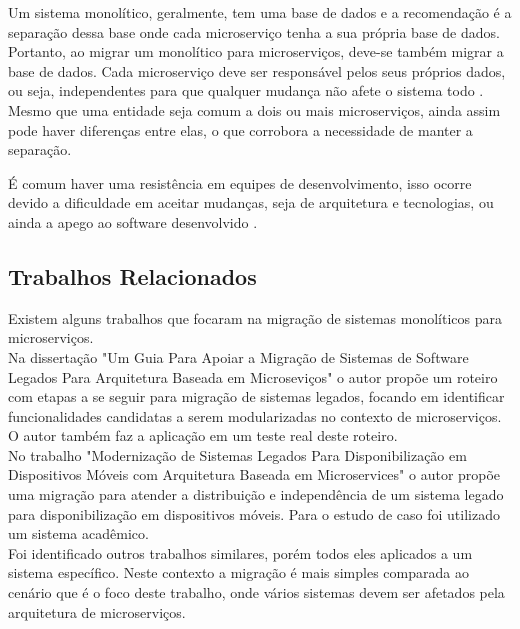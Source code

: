 \documentclass[12pt]{article}
\begin{document}

Um sistema monolítico, geralmente, tem uma base de dados e a recomendação é a separação dessa base onde cada microserviço tenha a sua própria base de dados. Portanto, ao migrar um monolítico para microserviços, deve-se também migrar a base de dados. Cada microserviço deve ser responsável pelos seus próprios dados, ou seja, independentes para que qualquer mudança não afete o sistema todo \cite{Kholy2019}. Mesmo que uma entidade seja comum a dois ou mais microserviços, ainda assim pode haver diferenças entre elas, o que corrobora a necessidade de manter a separação.

É comum haver uma resistência em equipes de desenvolvimento, isso ocorre devido a dificuldade em aceitar mudanças, seja de arquitetura e tecnologias, ou ainda a apego ao software desenvolvido \cite{Taibi}.


\subsection{Trabalhos Relacionados}
Existem alguns trabalhos que focaram na migração de sistemas monolíticos para microserviços.
\\Na dissertação "Um Guia Para Apoiar a Migração de Sistemas de Software Legados Para Arquitetura Baseada em Microseviços"\hspace{0.05cm} o autor propõe um roteiro com etapas a se seguir para migração de sistemas legados, focando em identificar funcionalidades candidatas a serem modularizadas no contexto de microserviços. O autor também faz a aplicação em um teste real deste roteiro.
\\No trabalho "Modernização de Sistemas Legados Para Disponibilização em Dispositivos Móveis com Arquitetura Baseada em Microservices" o autor propõe uma migração para atender a distribuição e independência de um sistema legado para disponibilização em dispositivos móveis. Para o estudo de caso foi utilizado um sistema acadêmico.
\\Foi identificado outros trabalhos similares, porém todos eles aplicados a um sistema específico. Neste contexto a migração é mais simples comparada ao cenário que é o foco deste trabalho, onde vários sistemas devem ser afetados pela arquitetura de microserviços.
\end{document}
